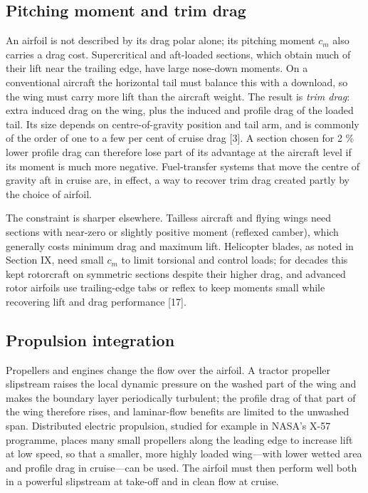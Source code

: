 \documentclass[10pt,a4paper,twocolumn]{article}
\begin{document}
\hypertarget{pitching-moment-and-trim-drag}{%
\subsection{Pitching moment and trim
drag}\label{pitching-moment-and-trim-drag}}

An airfoil is not described by its drag polar alone; its pitching moment
\(c_m\) also carries a drag cost. Supercritical and aft-loaded sections,
which obtain much of their lift near the trailing edge, have large
nose-down moments. On a conventional aircraft the horizontal tail must
balance this with a download, so the wing must carry more lift than the
aircraft weight. The result is \emph{trim drag}: extra induced drag on
the wing, plus the induced and profile drag of the loaded tail. Its size
depends on centre-of-gravity position and tail arm, and is commonly of
the order of one to a few per cent of cruise drag {[}3{]}. A section
chosen for 2 \% lower profile drag can therefore lose part of its
advantage at the aircraft level if its moment is much more negative.
Fuel-transfer systems that move the centre of gravity aft in cruise are,
in effect, a way to recover trim drag created partly by the choice of
airfoil.

The constraint is sharper elsewhere. Tailless aircraft and flying wings
need sections with near-zero or slightly positive moment (reflexed
camber), which generally costs minimum drag and maximum lift. Helicopter
blades, as noted in Section IX, need small \(c_m\) to limit torsional
and control loads; for decades this kept rotorcraft on symmetric
sections despite their higher drag, and advanced rotor airfoils use
trailing-edge tabs or reflex to keep moments small while recovering lift
and drag performance {[}17{]}.

\hypertarget{propulsion-integration}{%
\subsection{Propulsion integration}\label{propulsion-integration}}

Propellers and engines change the flow over the airfoil. A tractor
propeller slipstream raises the local dynamic pressure on the washed
part of the wing and makes the boundary layer periodically turbulent;
the profile drag of that part of the wing therefore rises, and
laminar-flow benefits are limited to the unwashed span. Distributed
electric propulsion, studied for example in NASA's X-57 programme,
places many small propellers along the leading edge to increase lift at
low speed, so that a smaller, more highly loaded wing---with lower
wetted area and profile drag in cruise---can be used. The airfoil must
then perform well both in a powerful slipstream at take-off and in clean
flow at cruise.
\end{document}
